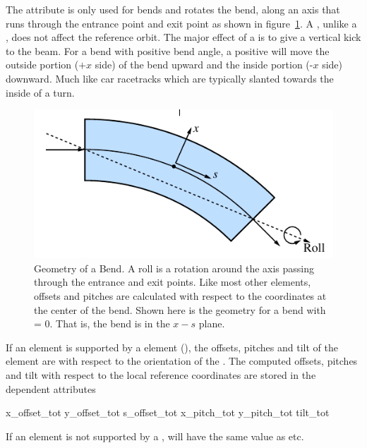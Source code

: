 The  attribute is only used for bends and rotates the bend,
along an axis that runs through the entrance point and exit point as
shown in figure~\ref{f:roll}. A , unlike a , does not affect the
reference orbit. The major effect of a  is to give a vertical
kick to the beam. For a bend with positive bend angle, a positive
 will move the outside portion ($+x$ side) of the bend upward
and the inside portion (-$x$ side) downward. Much like car racetracks
which are typically slanted towards the inside of a turn.

\begin{figure}[ht]
  \centering
  \includegraphics{roll.pdf}
  \caption[Geometry of a Bend]{
Geometry of a Bend. A roll is a rotation around the axis passing
through the entrance and exit points. Like most other elements,
offsets and pitches are calculated with respect to the coordinates at
the center of the bend. Shown here is the geometry for a bend with
 = 0. That is, the bend is in the $x-s$ plane.}
  \label{f:roll}
\end{figure}

If an element is supported by a  element (),
the offsets, pitches and tilt of the element are with respect to the
orientation of the . The computed offsets, pitches and tilt with
respect to the local reference coordinates are stored in the dependent attributes
\begin{example}
  x_offset_tot
  y_offset_tot
  s_offset_tot
  x_pitch_tot
  y_pitch_tot
  tilt_tot
\end{example}
If an element is not supported by a , 
will have the same value as  etc.

